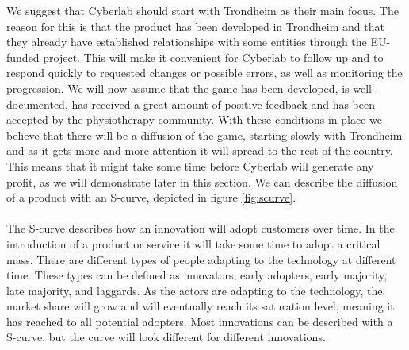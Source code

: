 We suggest that Cyberlab should start with Trondheim as their main focus. The reason for this is that the product has been developed in Trondheim and that they already have established relationships with some entities through the EU- funded project. This will make it convenient for Cyberlab to follow up and to respond quickly to requested changes or possible errors, as well as monitoring the progression. We will now assume that the game has been developed, is well-documented, has received a great amount of positive feedback and has been accepted by the physiotherapy community. With these conditions in place we believe that there will be a diffusion of the game, starting slowly with Trondheim and as it gets more and more attention it will spread to the rest of the country. This means that it might take some time before Cyberlab will generate any profit, as we will demonstrate later in this section. We can describe the diffusion of a product with an S-curve, depicted in figure \ref{fig:scurve}. \\ \\
The S-curve describes how an innovation will adopt customers over time. In the introduction of a product or service it will take some time to adopt a critical mass. There are different types of people adapting to the technology at different time. These types can be defined as innovators, early adopters, early majority, late majority, and laggards. As the actors are adapting to the technology, the market share will grow and will eventually reach its saturation level, meaning it has reached to all potential adopters. Most innovations can be described with a S-curve, but the curve will look different for different innovations\cite{scurve}.\\ \\
